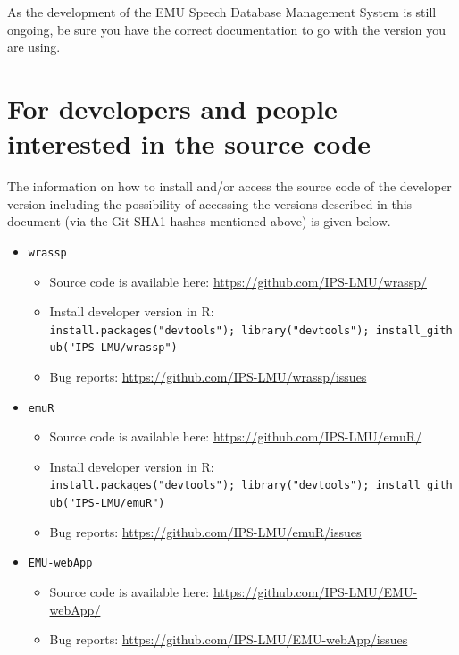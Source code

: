 \documentclass[]{book}
\providecommand{\tightlist}{%
  \setlength{\itemsep}{0pt}\setlength{\parskip}{0pt}}
\theoremstyle{definition}
\theoremstyle{definition}
\theoremstyle{definition}
\theoremstyle{remark}
\begin{document}
As the development of the EMU Speech Database Management System is still
ongoing, be sure you have the correct documentation to go with the
version you are using.

\section{For developers and people interested in the source
code}\label{for-developers-and-people-interested-in-the-source-code}

The information on how to install and/or access the source code of the
developer version including the possibility of accessing the versions
described in this document (via the Git SHA1 hashes mentioned above) is
given below.

\begin{itemize}
\tightlist
\item
  \texttt{wrassp}

  \begin{itemize}
  \tightlist
  \item
    Source code is available here:
    \url{https://github.com/IPS-LMU/wrassp/}
  \item
    Install developer version in R:
    \texttt{install.packages("devtools");\ library("devtools");\ install\_github("IPS-LMU/wrassp")}
  \item
    Bug reports: \url{https://github.com/IPS-LMU/wrassp/issues}
  \end{itemize}
\item
  \texttt{emuR}

  \begin{itemize}
  \tightlist
  \item
    Source code is available here:
    \url{https://github.com/IPS-LMU/emuR/}
  \item
    Install developer version in R:
    \texttt{install.packages("devtools");\ library("devtools");\ install\_github("IPS-LMU/emuR")}
  \item
    Bug reports: \url{https://github.com/IPS-LMU/emuR/issues}
  \end{itemize}
\item
  \texttt{EMU-webApp}

  \begin{itemize}
  \tightlist
  \item
    Source code is available here:
    \url{https://github.com/IPS-LMU/EMU-webApp/}
  \item
    Bug reports: \url{https://github.com/IPS-LMU/EMU-webApp/issues}
  \end{itemize}
\end{itemize}
\end{document}
